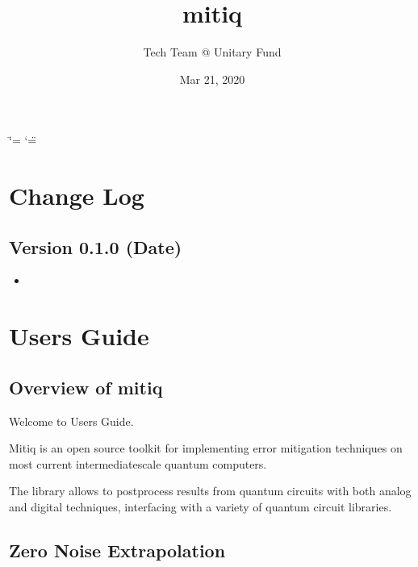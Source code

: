 \documentclass[letterpaper,10pt,english]{sphinxmanual}
\title{mitiq}
\date{Mar 21, 2020}
\author{Tech Team @ Unitary Fund}
\begin{document}
\ifdefined\shorthandoff
  \ifnum\catcode`\=\string=\active\shorthandoff{=}\fi
  \ifnum\catcode`\"=\active{}\fi
\fi

\pagestyle{empty}
\sphinxmaketitle
\pagestyle{plain}
\sphinxtableofcontents
\pagestyle{normal}
\label{\detokenize{index::doc}}



\chapter{Change Log}
\label{\detokenize{changelog:change-log}}\label{\detokenize{changelog:changelog}}\label{\detokenize{changelog::doc}}

\section{Version 0.1.0 (Date)}
\label{\detokenize{changelog:version-0-1-0-date}}\begin{itemize}
\item {} 

\end{itemize}


\chapter{Users Guide}
\label{\detokenize{guide/guide:users-guide}}\label{\detokenize{guide/guide:guide}}\label{\detokenize{guide/guide::doc}}

\section{Overview of mitiq}
\label{\detokenize{guide/guide-overview:overview-of-mitiq}}\label{\detokenize{guide/guide-overview::doc}}
Welcome to  Users Guide.

Mitiq is an open source toolkit for implementing error mitigation techniques on most current intermediate\sphinxhyphen{}scale quantum computers.

The library allows to postprocess results from quantum circuits with both analog and digital techniques, interfacing with a variety of quantum circuit libraries.


\section{Zero Noise Extrapolation}
\label{\detokenize{guide/guide-zne:zero-noise-extrapolation}}\label{\detokenize{guide/guide-zne::doc}}
\end{document}
